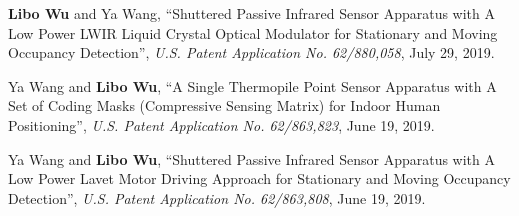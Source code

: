 

\begin{cvparagraph}


\vspace{12pt}
\begin{cvitems}
      \setlength{\itemsep}{2pt}
      \item \textbf{Libo Wu} and Ya Wang, ``Shuttered Passive Infrared Sensor Apparatus with A Low Power LWIR Liquid Crystal Optical Modulator for Stationary and Moving Occupancy Detection'', \textit{U.S. Patent Application No. 62/880,058}, July 29, 2019.

	\item Ya Wang and \textbf{Libo Wu}, ``A Single Thermopile Point Sensor Apparatus with A Set of Coding Masks (Compressive Sensing Matrix) for Indoor Human Positioning'', \textit{U.S. Patent Application No. 62/863,823}, June 19, 2019.
		
	\item Ya Wang and \textbf{Libo Wu}, ``Shuttered Passive Infrared Sensor Apparatus with A Low Power Lavet Motor Driving Approach for Stationary and Moving Occupancy Detection'', \textit{U.S. Patent Application No. 62/863,808}, June 19, 2019.   
\end{cvitems}
    
\end{cvparagraph}

